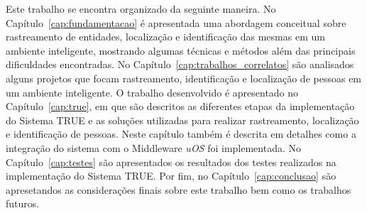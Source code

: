 
Este trabalho se encontra organizado da seguinte maneira. No Capítulo~\ref{cap:fundamentacao} é apresentada uma abordagem conceitual sobre rastreamento de entidades, localização e identificação das mesmas em um ambiente inteligente, mostrando algumas técnicas e métodos além das principais dificuldades encontradas. No Capítulo~\ref{cap:trabalhos_correlatos} são analisados alguns projetos que focam rastreamento, identificação e localização de pessoas em um ambiente inteligente. O trabalho desenvolvido é apresentado no Capítulo~\ref{cap:true}, em que são descritos as diferentes etapas da implementação do Sistema TRUE e as soluções utilizadas para realizar rastreamento, localização e identificação de pessoas. Neste capítulo também é descrita em detalhes como a integração do sistema com o Middleware \textit{uOS} foi implementada. No Capítulo~\ref{cap:testes} são apresentados os resultados dos testes realizados na implementação do Sistema TRUE. Por fim, no Capítulo~\ref{cap:conclusao} são apresetandos as considerações finais sobre este trabalho bem como os trabalhos futuros.


